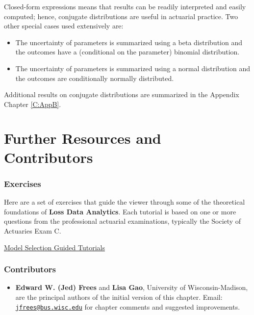 \documentclass[]{book}
\providecommand{\tightlist}{%
  \setlength{\itemsep}{0pt}\setlength{\parskip}{0pt}}
\theoremstyle{definition}
\theoremstyle{definition}
\theoremstyle{definition}
\theoremstyle{remark}
\begin{document}
Closed-form expressions means that results can be readily interpreted
and easily computed; hence, conjugate distributions are useful in
actuarial practice. Two other special cases used extensively are:

\begin{itemize}
\tightlist
\item
  The uncertainty of parameters is summarized using a beta distribution
  and the outcomes have a (conditional on the parameter) binomial
  distribution.
\item
  The uncertainty of parameters is summarized using a normal
  distribution and the outcomes are conditionally normally distributed.
\end{itemize}

Additional results on conjugate distributions are summarized in the
Appendix Chapter \ref{C:AppB}.

\section{Further Resources and
Contributors}\label{MS:further-reading-and-resources}

\subsubsection*{Exercises}\label{exercises-2}

Here are a set of exercises that guide the viewer through some of the
theoretical foundations of \textbf{Loss Data Analytics}. Each tutorial
is based on one or more questions from the professional actuarial
examinations, typically the Society of Actuaries Exam C.

\href{http://www.ssc.wisc.edu/~jfrees/loss-data-analytics/loss-data-analytics-model-selection/}{Model
Selection Guided Tutorials}

\subsubsection*{Contributors}\label{contributors-3}

\begin{itemize}
\tightlist
\item
  \textbf{Edward W. (Jed) Frees} and \textbf{Lisa Gao}, University of
  Wisconsin-Madison, are the principal authors of the initial version of
  this chapter. Email:
  \href{mailto:jfrees@bus.wisc.edu}{\nolinkurl{jfrees@bus.wisc.edu}} for
  chapter comments and suggested improvements.
\end{itemize}
\end{document}
